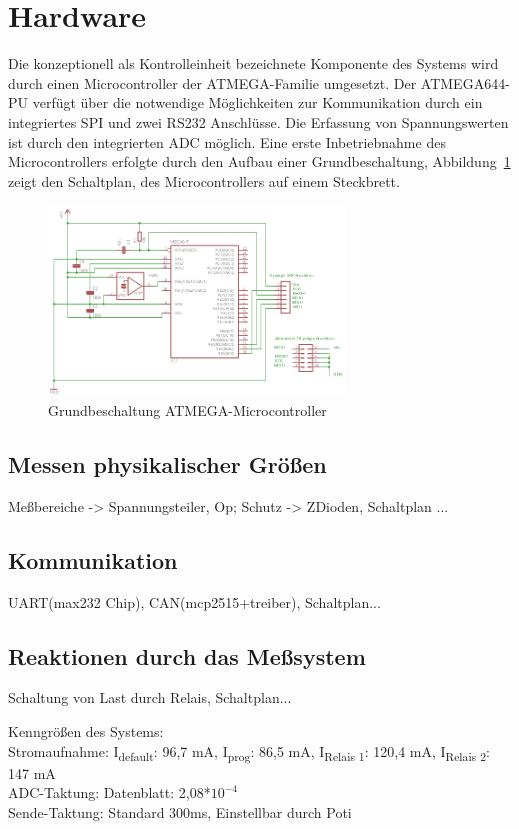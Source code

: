 \documentclass[
	11pt,								%
	a4paper,						%
	oneside,						%
	titlepage,					%
	headsepline,				%
	DIV13,							%
	abstracton,	 				%
	BCOR0cm,						%
	bibliography=totoc, %
]{scrreprt}							%
\begin{document}
\section{Hardware}
Die konzeptionell als Kontrolleinheit bezeichnete Komponente des Systems wird durch einen Microcontroller der ATMEGA-Familie umgesetzt. Der ATMEGA644-PU verfügt über
die notwendige Möglichkeiten zur Kommunikation durch ein integriertes SPI und zwei RS232 Anschlüsse. Die Erfassung von Spannungswerten ist durch den integrierten ADC möglich. 
Eine erste Inbetriebnahme des Microcontrollers erfolgte durch den Aufbau einer Grundbeschaltung, Abbildung~\ref{fig:grundsch}  zeigt den Schaltplan, des Microcontrollers auf einem Steckbrett.
 \begin{figure}[htb]
\centering
\includegraphics[width=0.7\textwidth]{images/schaltung_minimal.png}
\caption{Grundbeschaltung ATMEGA-Microcontroller}
\label{fig:grundsch}
\end{figure}
 \subsection{ Messen physikalischer Größen}
Meßbereiche -> Spannungsteiler, Op; Schutz -> ZDioden, Schaltplan ...
  
  \subsection{ Kommunikation}
  UART(max232 Chip), CAN(mcp2515+treiber), Schaltplan... 

  
  \subsection{ Reaktionen durch das Meßsystem}
Schaltung von Last durch Relais, Schaltplan...
  
Kenngrößen des Systems:\\
Stromaufnahme: I\textsubscript{default}: 96,7 mA, I\textsubscript{prog}: 86,5 mA, I\textsubscript{Relais 1}: 120,4 mA, I\textsubscript{Relais 2}: 147 mA\\
ADC-Taktung: Datenblatt: 2,08*$10^{-4}$\\
Sende-Taktung: Standard 300ms, Einstellbar durch Poti
\end{document}

